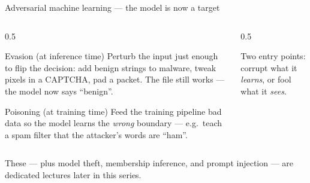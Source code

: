 \documentclass[aspectratio=169,10pt]{beamer}
\begin{document}
\begin{frame}{Adversarial machine learning --- the model is now a target}
  \begin{columns}[T]
    \begin{column}{0.5\textwidth}
      \begin{block}{\small Evasion (at inference time)}
        \small Perturb the input just enough to flip the decision:
        add benign strings to malware, tweak pixels in a CAPTCHA, pad a packet.
        The file still works --- the model now says ``benign''.
      \end{block}
      \begin{block}{\small Poisoning (at training time)}
        \small Feed the training pipeline bad data so the model learns the
        \emph{wrong} boundary --- e.g.\ teach a spam filter that the attacker's
        words are ``ham''.
      \end{block}
    \end{column}
    \begin{column}{0.5\textwidth}
      \centering
      \par\vspace{0.3em}
      {\footnotesize\color{midgray}Two entry points: corrupt what it \emph{learns},
      or fool what it \emph{sees}.}
    \end{column}
  \end{columns}
  \vfill
  {\footnotesize\color{midgray}These --- plus model theft, membership inference,
  and prompt injection --- are dedicated lectures later in this series.}
\end{frame}

\end{document}
